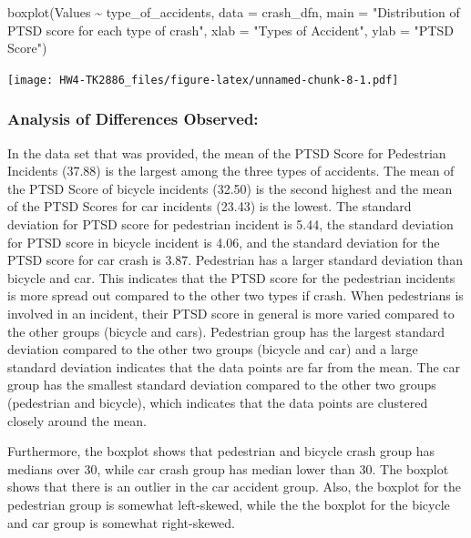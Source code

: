 \documentclass[
]{article}
\newenvironment{Shaded}{\begin{snugshade}}{\end{snugshade}}
\newcommand{\AttributeTok}[1]{\textcolor[rgb]{0.77,0.63,0.00}{#1}}
\newcommand{\FunctionTok}[1]{\textcolor[rgb]{0.00,0.00,0.00}{#1}}
\newcommand{\NormalTok}[1]{#1}
\newcommand{\SpecialCharTok}[1]{\textcolor[rgb]{0.00,0.00,0.00}{#1}}
\newcommand{\StringTok}[1]{\textcolor[rgb]{0.31,0.60,0.02}{#1}}
\begin{document}
\begin{Shaded}
\begin{Highlighting}[]
\FunctionTok{boxplot}\NormalTok{(Values }\SpecialCharTok{\textasciitilde{}}\NormalTok{ type\_of\_accidents, }\AttributeTok{data =}\NormalTok{ crash\_dfn,}
        \AttributeTok{main =} \StringTok{"Distribution of PTSD score for each type of crash"}\NormalTok{,}
        \AttributeTok{xlab =} \StringTok{"Types of Accident"}\NormalTok{,}
        \AttributeTok{ylab =} \StringTok{"PTSD Score"}\NormalTok{)}
\end{Highlighting}
\end{Shaded}

\texttt{[image: HW4-TK2886\_files/figure-latex/unnamed-chunk-8-1.pdf]}

\hypertarget{analysis-of-differences-observed}{%
\subsubsection{Analysis of Differences
Observed:}\label{analysis-of-differences-observed}}

In the data set that was provided, the mean of the PTSD Score for
Pedestrian Incidents (37.88) is the largest among the three types of
accidents. The mean of the PTSD Score of bicycle incidents (32.50) is
the second highest and the mean of the PTSD Scores for car incidents
(23.43) is the lowest. The standard deviation for PTSD score for
pedestrian incident is 5.44, the standard deviation for PTSD score in
bicycle incident is 4.06, and the standard deviation for the PTSD score
for car crash is 3.87. Pedestrian has a larger standard deviation than
bicycle and car. This indicates that the PTSD score for the pedestrian
incidents is more spread out compared to the other two types if crash.
When pedestrians is involved in an incident, their PTSD score in general
is more varied compared to the other groups (bicycle and cars).
Pedestrian group has the largest standard deviation compared to the
other two groups (bicycle and car) and a large standard deviation
indicates that the data points are far from the mean. The car group has
the smallest standard deviation compared to the other two groups
(pedestrian and bicycle), which indicates that the data points are
clustered closely around the mean.

Furthermore, the boxplot shows that pedestrian and bicycle crash group
has medians over 30, while car crash group has median lower than 30. The
boxplot shows that there is an outlier in the car accident group. Also,
the boxplot for the pedestrian group is somewhat left-skewed, while the
the boxplot for the bicycle and car group is somewhat right-skewed.
\end{document}
